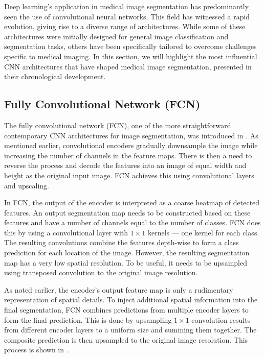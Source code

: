 Deep learning's application in medical image segmentation has predominantly seen the use of convolutional neural networks. This field has witnessed a rapid evolution, giving rise to a diverse range of architectures. While some of these architectures were initially designed for general image classification and segmentation tasks, others have been specifically tailored to overcome challenges specific to medical imaging. In this section, we will highlight the most influential CNN architectures that have shaped medical image segmentation, presented in their chronological development.

\subsection{Fully Convolutional Network (FCN)}

The fully convolutional network (FCN), one of the more straightforward contemporary CNN architectures for image segmentation, was introduced in \cite{long2015fully}. As mentioned earlier, convolutional encoders gradually downsample the image while increasing the number of channels in the feature maps. There is then a need to reverse the process and decode the features into an image of equal width and height as the original input image. FCN achieves this using convolutional layers and upscaling.

In FCN, the output of the encoder is interpreted as a coarse heatmap of detected features. An output segmentation map needs to be constructed based on these features and have a number of channels equal to the number of classes. FCN does this by using a convolutional layer with $1 \times 1$ kernels --- one kernel for each class. The resulting convolutions combine the features depth-wise to form a class prediction for each location of the image. However, the resulting segmentation map has a very low spatial resolution. To be useful, it needs to be upsampled using transposed convolution to the original image resolution.

As noted earlier, the encoder's output feature map is only a rudimentary representation of spatial details. To inject additional spatial information into the final segmentation, FCN combines predictions from multiple encoder layers to form the final prediction. This is done by upsampling $1 \times 1$ convolution results from different encoder layers to a uniform size and summing them together. The composite prediction is then upsampled to the original image resolution. This process is shown in . 

